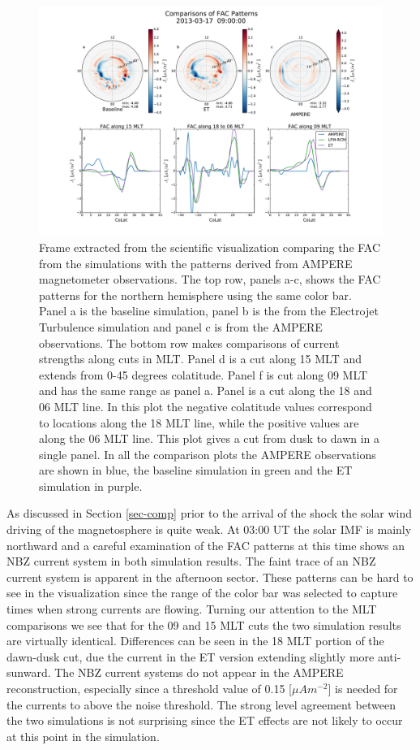 \documentclass[draft,jgrga]{agutex}
\begin{document}
\begin{article}
\begin{figure}[t]
\noindent\includegraphics[width=39pc]{JGR-AmpereComparison.pdf}
\caption{\label{ampere-comp-fig}
Frame extracted from the scientific visualization comparing the FAC from the simulations with the patterns derived from AMPERE magnetometer observations.  The top row, panels a-c, shows the FAC patterns for the northern hemisphere using the same color bar.  Panel a is the baseline simulation, panel b is the from the Electrojet Turbulence simulation and panel c is from the AMPERE observations.  The bottom row makes comparisons of current strengths along cuts in MLT.  Panel d is a cut along 15 MLT and extends from 0-45 degrees colatitude.   Panel f is cut along 09 MLT and has the same range as panel a.  Panel is a cut along the 18 and 06 MLT line.  In this plot the negative colatitude values correspond to locations along the 18 MLT line, while the positive values are along the 06 MLT line.  This plot gives a cut from dusk to dawn in a single panel.  In all the comparison plots the AMPERE observations are shown in blue, the baseline simulation in green and the ET simulation in purple.}
\end{figure}

As discussed in Section \ref{sec-comp} prior to the arrival of the shock the solar wind driving of the magnetosphere is quite weak.  At 03:00 UT the solar IMF is mainly northward and a careful examination of the FAC patterns at this time shows an NBZ current system in both simulation results.  The faint trace of an NBZ current system is apparent in the afternoon sector.  These patterns can be hard to see in the visualization since the range of the color bar was selected to capture times when strong currents are flowing.  Turning our attention to the MLT comparisons we see that for the 09 and 15 MLT cuts the two simulation results are virtually identical.  Differences can be seen in the 18 MLT portion of the dawn-dusk cut, due the current in the ET version extending slightly more anti-sunward.  The NBZ current systems do not appear in the AMPERE reconstruction, especially since a threshold value of 0.15 [$\mu A m^{-2}$] is needed for the currents to above the noise threshold.  The strong level agreement between the two simulations is not surprising since the ET effects are not likely to occur at this point in the simulation.


\end{article}
\end{document}
